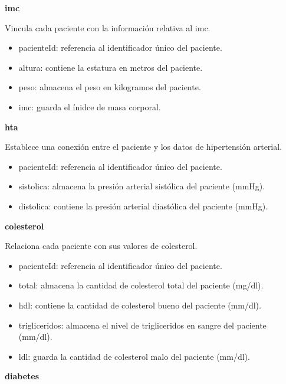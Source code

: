 \documentclass[11pt,spanish,
		listoftables,listoffigures]
		{tfgplantilla}
\begin{document}
\noindent
\textbf {imc}

Vincula cada paciente con la información relativa al imc.
\begin{itemize}
	\item pacienteId: referencia al identificador único del paciente.
	\item altura: contiene la estatura en metros del paciente.
	\item peso: almacena el peso en kilogramos del paciente.
	\item imc: guarda el ínidce de masa corporal.
\end{itemize}

\noindent
\textbf {hta}

Establece una conexión entre el paciente y los datos de hipertensión arterial.
\begin{itemize}
	\item pacienteId: referencia al identificador único del paciente.
	\item sistolica: almacena la presión arterial sistólica del paciente (mmHg).
	\item distolica: contiene la presión arterial diastólica del paciente (mmHg).
\end{itemize}

\noindent
\textbf {colesterol}

Relaciona cada paciente con sus valores de colesterol.
\begin{itemize}
	\item pacienteId: referencia al identificador único del paciente. 
	\item total: almacena la cantidad de colesterol total del paciente (mg/dl).
	\item hdl: contiene la cantidad de colesterol bueno del paciente (mm/dl).
	\item trigliceridos: almacena el nivel de trigliceridos en sangre del paciente (mm/dl).
	\item ldl: guarda la cantidad de colesterol malo del paciente (mm/dl).
\end{itemize}

\noindent
\textbf {diabetes}
\end{document}
